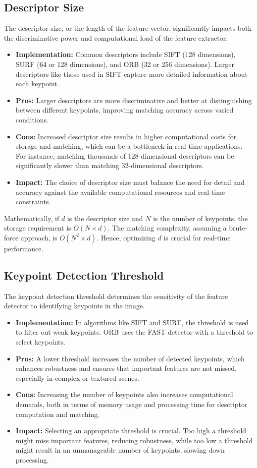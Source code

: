 \subsection{Descriptor Size}
The descriptor size, or the length of the feature vector, significantly impacts both the discriminative power and computational load of the feature extractor.
\begin{itemize}
    \item \textbf{Implementation:} Common descriptors include SIFT (128 dimensions), SURF (64 or 128 dimensions), and ORB (32 or 256 dimensions). Larger descriptors like those used in SIFT capture more detailed information about each keypoint.
    \item \textbf{Pros:} Larger descriptors are more discriminative and better at distinguishing between different keypoints, improving matching accuracy across varied conditions.
    \item \textbf{Cons:} Increased descriptor size results in higher computational costs for storage and matching, which can be a bottleneck in real-time applications. For instance, matching thousands of 128-dimensional descriptors can be significantly slower than matching 32-dimensional descriptors.
    \item \textbf{Impact:} The choice of descriptor size must balance the need for detail and accuracy against the available computational resources and real-time constraints.
\end{itemize}

Mathematically, if $d$ is the descriptor size and $N$ is the number of keypoints, the storage requirement is $O(N \times d)$. The matching complexity, assuming a brute-force approach, is $O(N^2 \times d)$. Hence, optimizing $d$ is crucial for real-time performance.

\subsection{Keypoint Detection Threshold}
The keypoint detection threshold determines the sensitivity of the feature detector to identifying keypoints in the image.
\begin{itemize}
    \item \textbf{Implementation:} In algorithms like SIFT and SURF, the threshold is used to filter out weak keypoints. ORB uses the FAST detector with a threshold to select keypoints.
    \item \textbf{Pros:} A lower threshold increases the number of detected keypoints, which enhances robustness and ensures that important features are not missed, especially in complex or textured scenes.
    \item \textbf{Cons:} Increasing the number of keypoints also increases computational demands, both in terms of memory usage and processing time for descriptor computation and matching.
    \item \textbf{Impact:} Selecting an appropriate threshold is crucial. Too high a threshold might miss important features, reducing robustness, while too low a threshold might result in an unmanageable number of keypoints, slowing down processing.
\end{itemize}

